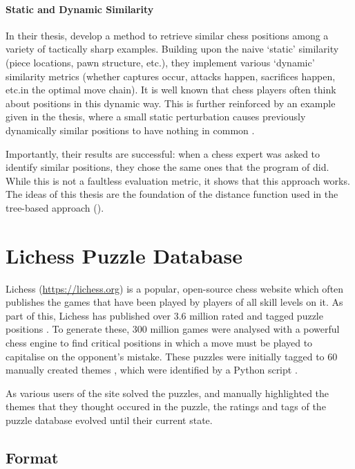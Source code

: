 \paragraph{Static and Dynamic Similarity}In their thesis, \citet{chessMotifs}
develop a method to retrieve similar chess positions among a variety of
tactically sharp examples. Building upon the naive `static' similarity (piece
locations, pawn structure, etc.\@), they implement various `dynamic' similarity
metrics (whether captures occur, attacks happen, sacrifices happen, etc.\@ in
the optimal move chain). It is well known \citep{thoughtAndChoice,
bilalic2010mechanisms} that chess players often think about positions in this
dynamic way. This is further reinforced by an example given in the thesis,
where a small static perturbation causes previously dynamically similar
positions to have nothing in common \citep{chessMotifs}.

Importantly, their results are successful: when a chess expert was asked to
identify similar positions, they chose the same ones that the program of
\cite{chessMotifs} did. While this is not a faultless evaluation metric, it
shows that this approach works. The ideas of this thesis are the foundation of
the distance function used in the tree-based approach ().

\section{Lichess Puzzle Database}\label{lichessPuzzlesSection}\label{bg5}

Lichess (\url{https://lichess.org}) is a popular, open-source chess website
which often publishes the games that have been played by players of all skill
levels on it. As part of this, Lichess has published over 3.6 million rated and
tagged puzzle positions \citep{lichessPuzzles}. To generate these, 300 million
games were analysed with a powerful chess engine to find critical positions in
which a move must be played to capitalise on the opponent's mistake. These
puzzles were initially tagged to 60 manually created themes \citep{lichessXML},
which were identified by a Python script \citep{lichessTagger}.

As various users of the site solved the puzzles, and manually highlighted the
themes that they thought occured in the puzzle, the ratings and tags of the
puzzle database evolved until their current state.

\subsection{Format}

